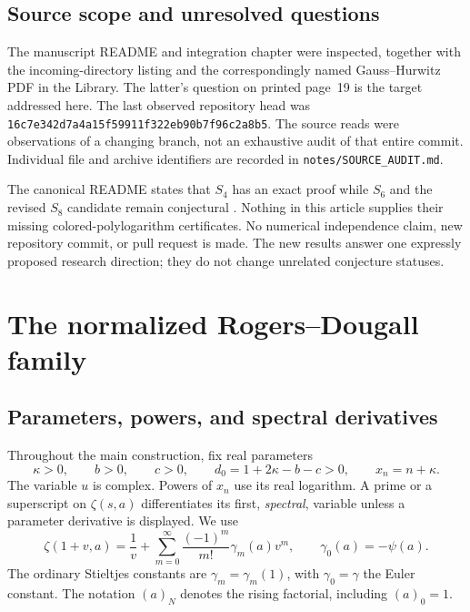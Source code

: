 \documentclass[11pt,letterpaper]{article}
\numberwithin{equation}{section}
\theoremstyle{definition}
\theoremstyle{remark}
\newcommand{\file}[1]{\nolinkurl{#1}}
\newcommand{\pin}{\texttt{16c7e342d7a4a15f59911f322eb90b7f96c2a8b5}}
\begin{document}
\subsection{Source scope and unresolved questions}

The manuscript README and integration chapter were inspected, together
with the incoming-directory listing and the correspondingly named Gauss--Hurwitz PDF
in the Library. The latter's question on printed page~19 is the target
addressed here. The last observed repository head was \pin. The source
reads were observations of a changing branch, not an exhaustive audit of
that entire commit. Individual file and archive identifiers are recorded
in \file{notes/SOURCE_AUDIT.md}.

The canonical README states that $S_4$ has an exact proof while $S_6$ and
the revised $S_8$ candidate remain conjectural \cite{repo-readme}. Nothing
in this article supplies their missing colored-polylogarithm certificates.
No numerical independence claim, new repository commit, or pull request is
made. The new results answer one expressly proposed research direction;
they do not change unrelated conjecture statuses.

\section{The normalized Rogers--Dougall family}
\label{dr:sec:family}

\subsection{Parameters, powers, and spectral derivatives}

Throughout the main construction, fix real parameters
\begin{equation}
 \kappa>0,\qquad b>0,\qquad c>0,\qquad
 d_0=1+2\kappa-b-c>0,
 \qquad x_n=n+\kappa.
 \label{dr:eq:domain}
\end{equation}
The variable $u$ is complex. Powers of $x_n$ use its real logarithm.
A prime or a superscript on $\zeta(s,a)$ differentiates its first,
\emph{spectral}, variable unless a parameter derivative is displayed.
We use
\begin{equation}
 \zeta(1+v,a)=\frac1v+
 \sum_{m=0}^{\infty}\frac{(-1)^m}{m!}\gamma_m(a)v^m,
 \qquad \gamma_0(a)=-\psi(a).
 \label{dr:eq:stieltjes}
\end{equation}
The ordinary Stieltjes constants are $\gamma_m=\gamma_m(1)$, with
$\gamma_0=\gamma$ the Euler constant. The notation $(a)_N$ denotes the
rising factorial, including $(a)_0=1$.
\end{document}

